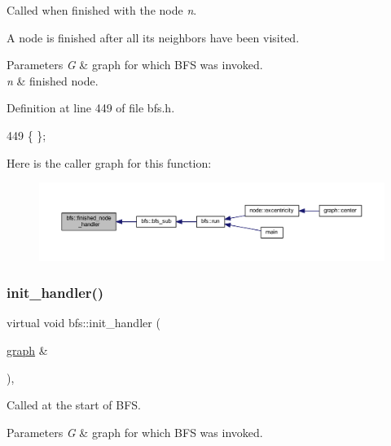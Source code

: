 Called when finished with the node {\itshape n}. 

A node is finished after all its neighbors have been visited.


\begin{DoxyParams}{Parameters}
{\em G} & graph for which B\+FS was invoked. \\
\hline
{\em n} & finished node. \\
\hline
\end{DoxyParams}


Definition at line 449 of file bfs.\+h.


\begin{DoxyCode}
449 \{ \};
\end{DoxyCode}
Here is the caller graph for this function\+:
\nopagebreak
\begin{figure}[H]
\begin{center}
\leavevmode
\includegraphics[width=350pt]{classbfs_a4d3f1d569910388b2ccece7cedd8bae4_icgraph}
\end{center}
\end{figure}
\mbox{\label{classbfs_a558582dd7a92ce3b3b512c523e589c23}} 
\subsubsection{\texorpdfstring{init\+\_\+handler()}{init\_handler()}}
{\footnotesize\ttfamily virtual void bfs\+::init\+\_\+handler (\begin{DoxyParamCaption}\item[{\mbox{\hyperlink{classgraph}{graph}} \&}]{ }\end{DoxyParamCaption})\hspace{0.3cm}{\ttfamily [inline]}, {\ttfamily [virtual]}}



Called at the start of B\+FS. 


\begin{DoxyParams}{Parameters}
{\em G} & graph for which B\+FS was invoked. \\
\hline
\end{DoxyParams}


